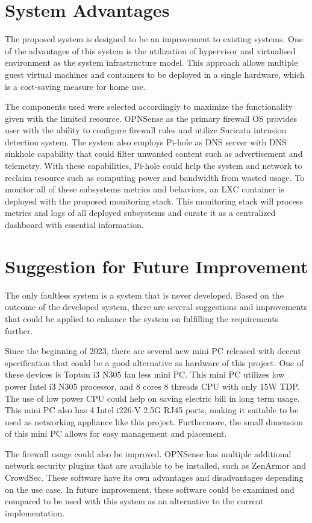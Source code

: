 \documentclass[../index.tex]{subfiles}
\begin{document}
\section{System Advantages}

The proposed system is designed to be an improvement to existing systems. One of the advantages of
this system is the utilization of hypervisor and virtualised environment as the system
infrastructure model. This approach allows multiple guest virtual machines and containers to be
deployed in a single hardware, which is a cost-saving measure for home use.

The components used were selected accordingly to maximize the functionality given with the limited
resource. OPNSense as the primary firewall OS provides user with the ability to configure firewall
rules and utilize Suricata intrusion detection system. The system also employs Pi-hole as DNS server
with DNS sinkhole capability that could filter unwanted content such as advertisement and telemetry.
With these capabilities, Pi-hole could help the system and network to reclaim resource such as
computing power and bandwidth from wasted usage. To monitor all of these subsystems metrics and
behaviors, an LXC container is deployed with the proposed monitoring stack. This monitoring stack
will process metrics and logs of all deployed subsystems and curate it as a centralized dashboard
with essential information.

\section{Suggestion for Future Improvement}

The only faultless system is a system that is never developed. Based on the outcome of the developed
system, there are several suggestions and improvements that could be applied to enhance the system
on fulfilling the requirements further.

Since the beginning of 2023, there are several new mini PC released with decent specification that
could be a good alternative as hardware of this project. One of these devices is Topton i3 N305 fan
less mini PC. This mini PC utilizes low power Intel i3 N305 processor, and 8 cores 8 threads CPU
with only 15W TDP. The use of low power CPU could help on saving electric bill in long term usage.
This mini PC also has 4 Intel i226-V 2.5G RJ45 ports, making it suitable to be used as networking
appliance like this project. Furthermore, the small dimension of this mini PC allows for easy
management and placement.

The firewall usage could also be improved. OPNSense has multiple additional network security plugins
that are available to be installed, such as ZenArmor and CrowdSec. These software have its own
advantages and disadvantages depending on the use case. In future improvement, these software could
be examined and compared to be used with this system as an alternative to the current
implementation.
\end{document}
